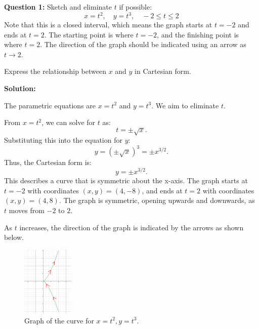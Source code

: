 \documentclass{article}
\begin{document}
\begin{exercisebox}
\textbf{Question 1:} Sketch and eliminate \( t \) if possible: \\
\[
    x = t^2, \quad y = t^3, \quad -2 \leq t \leq 2
\]
Note that this is a closed interval, which means the graph starts at \( t = -2 \) and ends at \( t = 2 \). The starting point is where \( t = -2 \), and the finishing point is where \( t = 2 \). The direction of the graph should be indicated using an arrow as \( t \to 2 \).

Express the relationship between \( x \) and \( y \) in Cartesian form.

\begin{solutionbox}
    \textbf{Solution:}
    
    The parametric equations are \( x = t^2 \) and \( y = t^3 \). We aim to eliminate \( t \).
    
    From \( x = t^2 \), we can solve for \( t \) as:
    \[
        t = \pm \sqrt{x}.
    \]
    Substituting this into the equation for \( y \):
    \[
        y = (\pm \sqrt{x})^3 = \pm x^{3/2}.
    \]
    Thus, the Cartesian form is:
    \[
        y = \pm x^{3/2}.
    \]
    This describes a curve that is symmetric about the x-axis. The graph starts at \( t = -2 \) with coordinates \( (x, y) = (4, -8) \), and ends at \( t = 2 \) with coordinates \( (x, y) = (4, 8) \). The graph is symmetric, opening upwards and downwards, as \( t \) moves from \( -2 \) to \( 2 \).
    
    As \( t \) increases, the direction of the graph is indicated by the arrows as shown below.
    
    \begin{figure}[H]
        \centering
        \includegraphics[width=0.22\textwidth]{curvesketchingpractice1.png}
        \caption{Graph of the curve for \( x = t^2, y = t^3 \).}
        \label{fig:curvesketchingpractice1}
    \end{figure}
\end{solutionbox}
\end{exercisebox}
\end{document}
